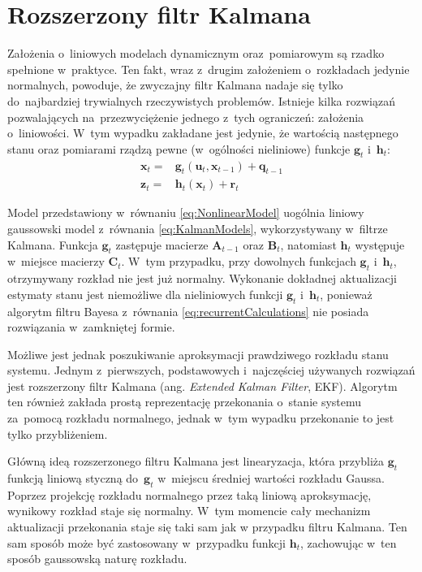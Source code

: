 \section{Rozszerzony filtr Kalmana} \label{ExtendedKalmanFilter}
Założenia o~liniowych modelach dynamicznym oraz~pomiarowym są rzadko spełnione w~praktyce. Ten fakt, wraz z~drugim założeniem o~rozkładach jedynie normalnych, powoduje, że zwyczajny filtr Kalmana nadaje się tylko do~najbardziej trywialnych rzeczywistych problemów. Istnieje kilka rozwiązań pozwalających na~przezwyciężenie jednego z~tych ograniczeń: założenia o~liniowości. W~tym wypadku zakładane jest jedynie, że wartością następnego stanu oraz pomiarami rządzą pewne (w~ogólności nieliniowe) funkcje $\boldsymbol{g}_t$ i~$\boldsymbol{h}_t$:
\begin{align} 
\boldsymbol{x}_t =& \boldsymbol{g}_t(\boldsymbol{u}_t, \boldsymbol{x}_{t-1}) + \boldsymbol{q}_{t-1} \nonumber \\
\boldsymbol{z}_t =& \boldsymbol{h}_t(\boldsymbol{x}_{t}) + \boldsymbol{r}_{t} \label{eq:NonlinearModel}
\end{align}
\par
Model przedstawiony w~równaniu \ref{eq:NonlinearModel} uogólnia liniowy gaussowski model z~równania \ref{eq:KalmanModels}, wykorzystywany w~filtrze Kalmana. Funkcja $\boldsymbol{g}_t$ zastępuje macierze $\boldsymbol{A}_{t-1}$ oraz $\boldsymbol{B}_{t}$, natomiast $\boldsymbol{h}_t$ występuje w~miejsce macierzy $\boldsymbol{C}_t$. W~tym przypadku, przy dowolnych funkcjach $\boldsymbol{g}_t$ i~$\boldsymbol{h}_t$, otrzymywany rozkład nie jest już normalny. Wykonanie dokładnej aktualizacji estymaty stanu jest niemożliwe dla nieliniowych funkcji $\boldsymbol{g}_t$ i~$\boldsymbol{h}_t$, ponieważ algorytm filtru Bayesa z~równania \ref{eq:recurrentCalculations} nie posiada rozwiązania w~zamkniętej formie.
\par
Możliwe jest jednak poszukiwanie aproksymacji prawdziwego rozkładu stanu systemu. Jednym z~pierwszych, podstawowych i~najczęściej używanych rozwiązań jest rozszerzony filtr Kalmana (ang. \textit{Extended Kalman Filter}, EKF). Algorytm ten również zakłada prostą reprezentację przekonania o~stanie systemu za~pomocą rozkładu normalnego, jednak w~tym wypadku przekonanie to jest tylko przybliżeniem.
\par
Główną ideą rozszerzonego filtru Kalmana jest linearyzacja, która przybliża $\boldsymbol{g}_t$ funkcją liniową styczną do~$\boldsymbol{g}_t$ w~miejscu średniej wartości rozkładu Gaussa. Poprzez projekcję rozkładu normalnego przez taką liniową aproksymację, wynikowy rozkład staje się normalny. W~tym momencie cały mechanizm aktualizacji przekonania staje się taki sam jak w przypadku filtru Kalmana. Ten sam sposób może być zastosowany w~przypadku funkcji $\boldsymbol{h}_t$, zachowując w~ten sposób gaussowską naturę rozkładu.
